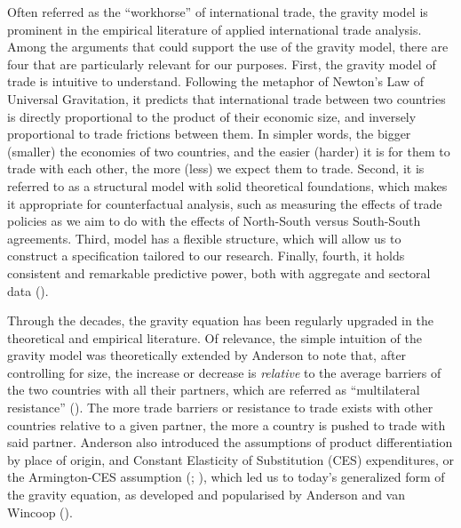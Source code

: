 %
Often referred as the ``workhorse'' of international trade, the gravity
model is prominent in the empirical literature of applied international
trade analysis. Among the arguments that could support the use of the
gravity model, there are four that are particularly relevant for our
purposes. First, the gravity model of trade is intuitive to understand.
Following the metaphor of Newton's Law of Universal Gravitation, it
predicts that international trade between two countries is directly
proportional to the product of their economic size, and inversely
proportional to trade frictions between them. In simpler words, the
bigger (smaller) the economies of two countries, and the easier (harder)
it is for them to trade with each other, the more (less) we expect them
to trade. Second, it is referred to as a structural model with solid
theoretical foundations, which makes it appropriate for counterfactual
analysis, such as measuring the effects of trade policies as we aim to
do with the effects of North-South versus South-South agreements. Third,
model has a flexible structure, which will allow us to construct a
specification tailored to our research. Finally, fourth, it holds
consistent and remarkable predictive power, both with aggregate and
sectoral data (\cite{yotov_advanced_2016}).

Through the decades, the gravity equation has been regularly upgraded in
the theoretical and empirical literature. Of relevance, the simple
intuition of the gravity model was theoretically extended by Anderson to
note that, after controlling for size, the increase or decrease is
\emph{relative} to the average barriers of the two countries with all
their partners, which are referred as ``multilateral resistance''
(\cite{anderson_theoretical_1979}). The more trade barriers or resistance to trade exists
with other countries relative to a given partner, the more a country is
pushed to trade with said partner. Anderson also introduced the
assumptions of product differentiation by place of origin, and Constant
Elasticity of Substitution (CES) expenditures, or the Armington-CES
assumption (\cite{yotov_advanced_2016}; \cite{chatzilazarou_trade_2023}), which
led us to today's generalized form of the gravity equation, as developed
and popularised by Anderson and van Wincoop (\cite{anderson_gravity_2003}).

